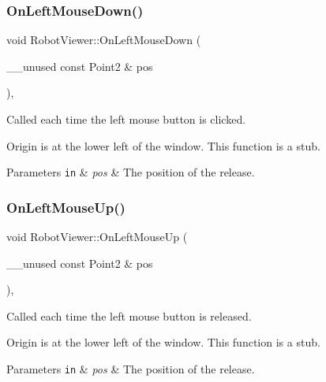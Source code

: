 \subsubsection{\texorpdfstring{On\+Left\+Mouse\+Down()}{OnLeftMouseDown()}}
{\footnotesize\ttfamily void Robot\+Viewer\+::\+On\+Left\+Mouse\+Down (\begin{DoxyParamCaption}\item[{\+\_\+\+\_\+unused const Point2 \&}]{pos }\end{DoxyParamCaption})\hspace{0.3cm}{\ttfamily [inline]}, {\ttfamily [override]}}



Called each time the left mouse button is clicked. 

Origin is at the lower left of the window. This function is a stub.


\begin{DoxyParams}[1]{Parameters}
\mbox{\tt in}  & {\em pos} & The position of the release. \\
\hline
\end{DoxyParams}
\mbox{\label{classRobotViewer_a4b9372334e89152c2f8daf2cc2687943}} 
\subsubsection{\texorpdfstring{On\+Left\+Mouse\+Up()}{OnLeftMouseUp()}}
{\footnotesize\ttfamily void Robot\+Viewer\+::\+On\+Left\+Mouse\+Up (\begin{DoxyParamCaption}\item[{\+\_\+\+\_\+unused const Point2 \&}]{pos }\end{DoxyParamCaption})\hspace{0.3cm}{\ttfamily [inline]}, {\ttfamily [override]}}



Called each time the left mouse button is released. 

Origin is at the lower left of the window. This function is a stub.


\begin{DoxyParams}[1]{Parameters}
\mbox{\tt in}  & {\em pos} & The position of the release. \\
\hline
\end{DoxyParams}
\mbox{\label{classRobotViewer_ae3b11d89a8f596d43bd7127ed7cfccf5}} 
